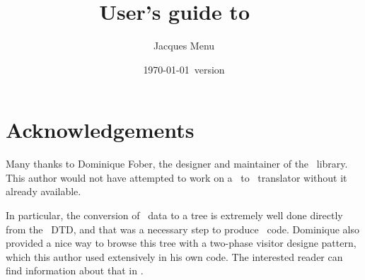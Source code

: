 \documentclass[12pt,a4paper]{article}
\begin{document}


\title{
User's guide to \xmlToLy\ \\[5pt]
}

\author{
Jacques Menu 
}

\date {\normalsize \today\ version}

\maketitle
\thispagestyle{fancy} %


\section{Acknowledgements}

Many thanks to Dominique Fober, the designer and maintainer of the \lib\ library. This author would not have attempted to work on a \mxml\ to \lily\ translator without it already available.

In particular, the conversion of \mxml\ data to a tree is extremely well done directly from the \mxml\ DTD, and that was a necessary step to produce \lily\ code. Dominique also provided a nice way to browse this tree with a two-phase visitor designe pattern, which this author used extensively in his own code. The interested reader can find information about that in .
\end{document}
